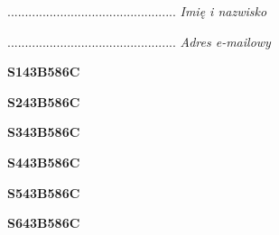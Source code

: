 \begin{turn}{90}\begin{minipage}{\linewidth} \vspace{20mm} ................................................  \textit{Imię i nazwisko}\end{minipage}\end{turn}

\begin{turn}{90}\begin{minipage}{\linewidth} \vspace{20mm} ................................................  \textit{Adres e-mailowy}\end{minipage}\end{turn}

\begin{turn}{90}\huge \begin{minipage}{\linewidth} \vspace{10mm}\textbf{S143B586C}\end{minipage}\end{turn}

\begin{turn}{90}\huge \begin{minipage}{\linewidth} \vspace{10mm}\textbf{S243B586C}\end{minipage}\end{turn}

\begin{turn}{90}\huge \begin{minipage}{\linewidth} \vspace{10mm}\textbf{S343B586C}\end{minipage}\end{turn}

\begin{turn}{90}\huge \begin{minipage}{\linewidth} \vspace{10mm}\textbf{S443B586C}\end{minipage}\end{turn}

\begin{turn}{90}\huge \begin{minipage}{\linewidth} \vspace{10mm}\textbf{S543B586C}\end{minipage}\end{turn}

\begin{turn}{90}\huge \begin{minipage}{\linewidth} \vspace{10mm}\textbf{S643B586C}\end{minipage}\end{turn}

